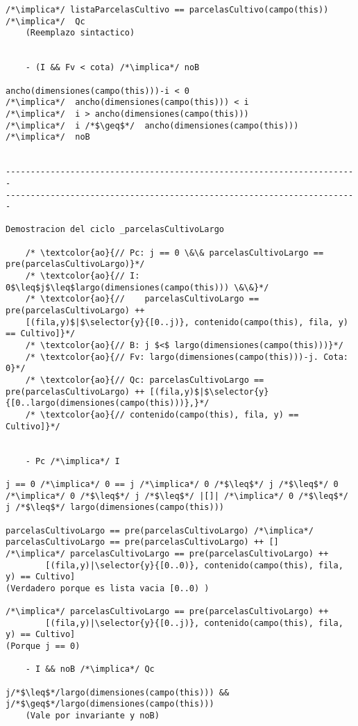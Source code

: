 \begin{lstlisting}
/*\implica*/ listaParcelasCultivo == parcelasCultivo(campo(this))  /*\implica*/  Qc
	(Reemplazo sintactico)
	
	
    - (I && Fv < cota) /*\implica*/ noB
    
ancho(dimensiones(campo(this)))-i < 0
/*\implica*/  ancho(dimensiones(campo(this))) < i
/*\implica*/  i > ancho(dimensiones(campo(this)))
/*\implica*/  i /*$\geq$*/  ancho(dimensiones(campo(this))) /*\implica*/  noB

	
-----------------------------------------------------------------------
-----------------------------------------------------------------------

Demostracion del ciclo _parcelasCultivoLargo

    /* \textcolor{ao}{// Pc: j == 0 \&\& parcelasCultivoLargo == pre(parcelasCultivoLargo)}*/      
    /* \textcolor{ao}{// I: 0$\leq$j$\leq$largo(dimensiones(campo(this))) \&\&}*/        
    /* \textcolor{ao}{//    parcelasCultivoLargo == pre(parcelasCultivoLargo) ++ 
    [(fila,y)$|$\selector{y}{[0..j)}, contenido(campo(this), fila, y) == Cultivo]}*/ 
    /* \textcolor{ao}{// B: j $<$ largo(dimensiones(campo(this)))}*/
	/* \textcolor{ao}{// Fv: largo(dimensiones(campo(this)))-j. Cota: 0}*/     
    /* \textcolor{ao}{// Qc: parcelasCultivoLargo == pre(parcelasCultivoLargo) ++ [(fila,y)$|$\selector{y}{[0..largo(dimensiones(campo(this)))},}*/
    /* \textcolor{ao}{// contenido(campo(this), fila, y) == Cultivo]}*/      


    - Pc /*\implica*/ I
   
j == 0 /*\implica*/ 0 == j /*\implica*/ 0 /*$\leq$*/ j /*$\leq$*/ 0
/*\implica*/ 0 /*$\leq$*/ j /*$\leq$*/ |[]| /*\implica*/ 0 /*$\leq$*/ j /*$\leq$*/ largo(dimensiones(campo(this)))

parcelasCultivoLargo == pre(parcelasCultivoLargo) /*\implica*/ parcelasCultivoLargo == pre(parcelasCultivoLargo) ++ []
/*\implica*/ parcelasCultivoLargo == pre(parcelasCultivoLargo) ++ 
		[(fila,y)|\selector{y}{[0..0)}, contenido(campo(this), fila, y) == Cultivo]
(Verdadero porque es lista vacia [0..0) )

/*\implica*/ parcelasCultivoLargo == pre(parcelasCultivoLargo) ++ 
		[(fila,y)|\selector{y}{[0..j)}, contenido(campo(this), fila, y) == Cultivo]    
(Porque j == 0)

    - I && noB /*\implica*/ Qc

j/*$\leq$*/largo(dimensiones(campo(this))) && j/*$\geq$*/largo(dimensiones(campo(this)))
	(Vale por invariante y noB)


\end{lstlisting}
